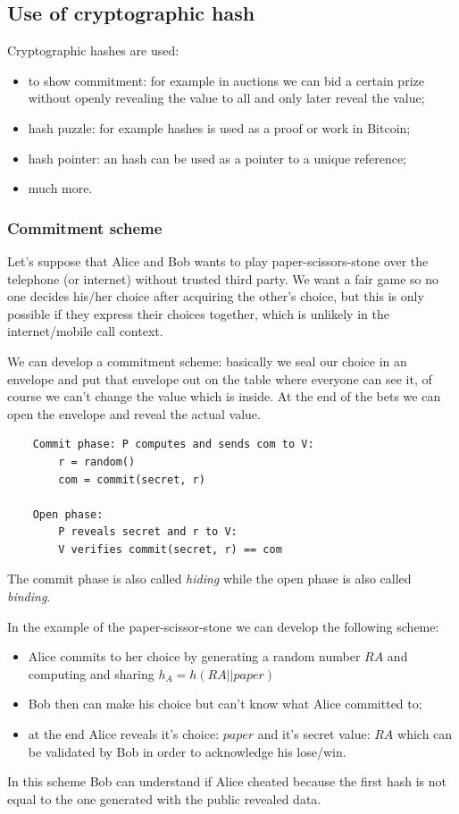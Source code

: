 \subsection{Use of cryptographic hash}
Cryptographic hashes are used:
\begin{itemize}
    \item to show commitment: for example in auctions we can bid a certain prize without openly revealing the value to all and only later reveal the value;
    \item hash puzzle: for example hashes is used as a proof or work in Bitcoin;
    \item hash pointer: an hash can be used as a pointer to a unique reference;
    \item much more.
\end{itemize}

\subsubsection{Commitment scheme}
Let's suppose that Alice and Bob wants to play paper-scissors-stone over the telephone (or internet) without trusted third party.
We want a fair game so no one decides his/her choice after acquiring the other's choice, but this is only possible if they express their choices together, which is unlikely in the internet/mobile call context.

We can develop a commitment scheme: basically we seal our choice in an envelope and put that envelope out on the table where everyone can see it, of course we can't change the value which is inside.
At the end of the bets we can open the envelope and reveal the actual value.

\begin{verbatim}
    Commit phase: P computes and sends com to V:
        r = random()
        com = commit(secret, r)

    Open phase:
        P reveals secret and r to V:
        V verifies commit(secret, r) == com
\end{verbatim}
The commit phase is also called \emph{hiding} while the open phase is also called \emph{binding}.

In the example of the paper-scissor-stone we can develop the following scheme:
\begin{itemize}
    \item Alice commits to her choice by generating a random number $RA$ and computing and sharing $h_A = h(RA || paper)$
    \item Bob then can make his choice but can't know what Alice committed to;
    \item at the end Alice reveals it's choice: $paper$ and it's secret value: $RA$ which can be validated by Bob in order to acknowledge his lose/win.
\end{itemize}
In this scheme Bob can understand if Alice cheated because the first hash is not equal to the one generated with the public revealed data.

